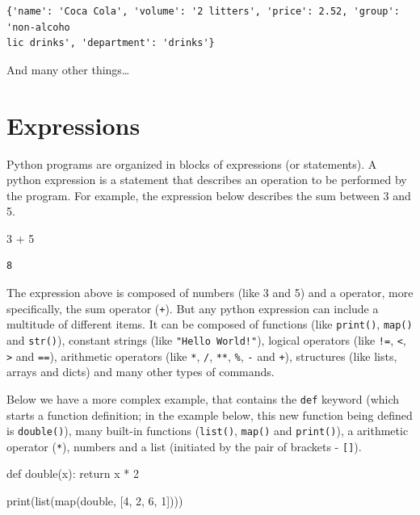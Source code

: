 \documentclass[
  11pt,
  letterpaper,
  DIV=11,
  numbers=noendperiod]{scrreprt}
\newenvironment{Shaded}{\begin{snugshade}}{\end{snugshade}}
\newcommand{\BuiltInTok}[1]{\textcolor[rgb]{0.00,0.23,0.31}{#1}}
\newcommand{\ControlFlowTok}[1]{\textcolor[rgb]{0.00,0.23,0.31}{#1}}
\newcommand{\DecValTok}[1]{\textcolor[rgb]{0.68,0.00,0.00}{#1}}
\newcommand{\KeywordTok}[1]{\textcolor[rgb]{0.00,0.23,0.31}{#1}}
\newcommand{\NormalTok}[1]{\textcolor[rgb]{0.00,0.23,0.31}{#1}}
\newcommand{\OperatorTok}[1]{\textcolor[rgb]{0.37,0.37,0.37}{#1}}
\begin{document}
\begin{verbatim}
{'name': 'Coca Cola', 'volume': '2 litters', 'price': 2.52, 'group': 'non-alcoho
lic drinks', 'department': 'drinks'}
\end{verbatim}

And many other things\ldots{}

\hypertarget{expressions}{%
\section{Expressions}\label{expressions}}

Python programs are organized in blocks of expressions (or statements).
A python expression is a statement that describes an operation to be
performed by the program. For example, the expression below describes
the sum between 3 and 5.

\begin{Shaded}
\begin{Highlighting}[]
\DecValTok{3} \OperatorTok{+} \DecValTok{5}
\end{Highlighting}
\end{Shaded}

\begin{verbatim}
8
\end{verbatim}

The expression above is composed of numbers (like 3 and 5) and a
operator, more specifically, the sum operator (\texttt{+}). But any
python expression can include a multitude of different items. It can be
composed of functions (like \texttt{print()}, \texttt{map()} and
\texttt{str()}), constant strings (like \texttt{"Hello\ World!"}),
logical operators (like \texttt{!=}, \texttt{\textless{}},
\texttt{\textgreater{}} and \texttt{==}), arithmetic operators (like
\texttt{*}, \texttt{/}, \texttt{**}, \texttt{\%}, \texttt{-} and
\texttt{+}), structures (like lists, arrays and dicts) and many other
types of commands.

Below we have a more complex example, that contains the \texttt{def}
keyword (which starts a function definition; in the example below, this
new function being defined is \texttt{double()}), many built-in
functions (\texttt{list()}, \texttt{map()} and \texttt{print()}), a
arithmetic operator (\texttt{*}), numbers and a list (initiated by the
pair of brackets - \texttt{{[}{]}}).

\begin{Shaded}
\begin{Highlighting}[]
\KeywordTok{def}\NormalTok{ double(x):}
  \ControlFlowTok{return}\NormalTok{ x }\OperatorTok{*} \DecValTok{2}
  
\BuiltInTok{print}\NormalTok{(}\BuiltInTok{list}\NormalTok{(}\BuiltInTok{map}\NormalTok{(double, [}\DecValTok{4}\NormalTok{, }\DecValTok{2}\NormalTok{, }\DecValTok{6}\NormalTok{, }\DecValTok{1}\NormalTok{])))}
\end{Highlighting}
\end{Shaded}
\end{document}
